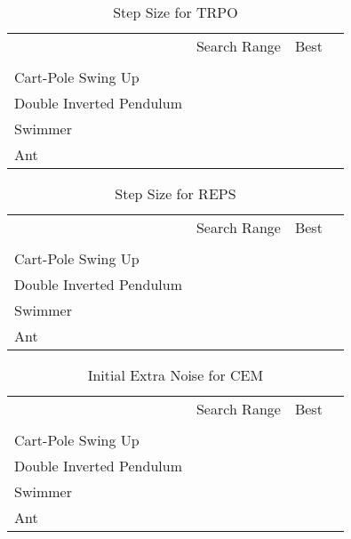 \documentclass{article}
\begin{document}
\begin{table}[!h]
\centering
\caption{Step Size  for TRPO}
\label{hyper_trpo}
\begin{tabular}{l|lll}
\cline{1-4} \\ [-8pt]
 & Search Range              & Best                 &  \\ [2pt] \cline{1-4} \\ [-8pt]
Cart-Pole Swing Up     &             &                &  \\
Double Inverted Pendulum     &      &                &  \\
Swimmer               &             &                &  \\
Ant                   &             &                &  \\ [2pt] \cline{1-4}
\end{tabular}
\end{table}

\begin{table}[!h]
\centering
\caption{Step Size  for REPS}
\label{hyper_reps}
\begin{tabular}{l|lll}
\cline{1-4} \\ [-8pt]
 & Search Range              & Best                 &  \\ [2pt] \cline{1-4} \\ [-8pt]
Cart-Pole Swing Up     &             &                &  \\
Double Inverted Pendulum     &      &                &  \\
Swimmer               &             &                &  \\
Ant                   &             &                &  \\ [2pt] \cline{1-4}
\end{tabular}
\end{table}

\begin{table}[!h]
\centering
\caption{Initial Extra Noise for CEM}
\label{hyper_cem}
\begin{tabular}{l|lll}
\cline{1-4} \\ [-8pt]
  & Search Range              & Best                 &  \\ [2pt] \cline{1-4} \\ [-8pt]
Cart-Pole Swing Up     &             &                &  \\
Double Inverted Pendulum     &      &                &  \\
Swimmer               &             &                &  \\
Ant                   &             &                &  \\ [2pt] \cline{1-4}
\end{tabular}
\end{table}
\end{document}
